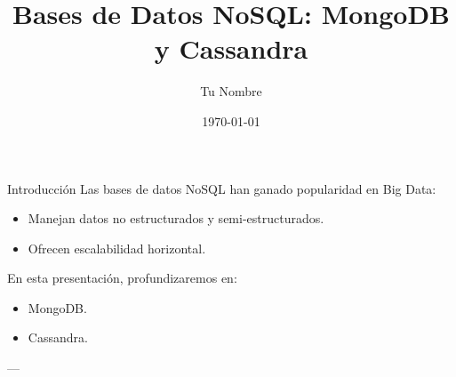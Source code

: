 \documentclass[presentation]{beamer}
\author{Tu Nombre}
\date{\today{}}
\title{Bases de Datos NoSQL: MongoDB y Cassandra}
\begin{document}
\maketitle

\begin{frame}[label={sec:org621383a}]{Introducción}
Las bases de datos NoSQL han ganado popularidad en Big Data:
\begin{itemize}
\item Manejan datos no estructurados y semi-estructurados.
\item Ofrecen escalabilidad horizontal.
\end{itemize}

En esta presentación, profundizaremos en:
\begin{itemize}
\item \alert{\alert{MongoDB}}.
\item \alert{\alert{Cassandra}}.
\end{itemize}

---
\end{frame}
\end{document}
